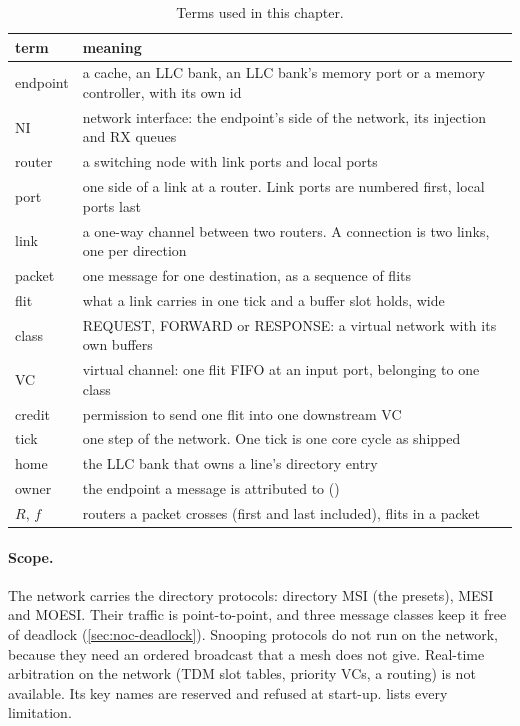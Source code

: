 \begin{table}[htbp]\centering\small
\caption{Terms used in this chapter.}\label{tab:noc-terms}
\begin{tabularx}{\textwidth}{@{}lY@{}}
\toprule term & meaning \\ \midrule
endpoint & a cache, an LLC bank, an LLC bank's memory port or a memory controller, with its own id \\
NI & network interface: the endpoint's side of the network, its injection and RX queues \\
router & a switching node with link ports and local ports \\
port & one side of a link at a router. Link ports are numbered first, local ports last \\
link & a one-way channel between two routers. A connection is two links, one per direction \\
packet & one message for one destination, as a sequence of flits \\
flit & what a link carries in one tick and a buffer slot holds,  wide \\
class & REQUEST, FORWARD or RESPONSE: a virtual network with its own buffers \\
VC & virtual channel: one flit FIFO at an input port, belonging to one class \\
credit & permission to send one flit into one downstream VC \\
tick & one step of the network. One tick is one core cycle as shipped \\
home & the LLC bank that owns a line's directory entry \\
owner & the endpoint a message is attributed to () \\
$R$, $f$ & routers a packet crosses (first and last included), flits in a packet \\
\bottomrule
\end{tabularx}
\end{table}

\paragraph{Scope.} The network carries the directory protocols: directory MSI (the presets),
MESI and MOESI. Their traffic is point-to-point, and three message classes keep it free of
deadlock (\cref{sec:noc-deadlock}). Snooping protocols do not run on the network, because they need
an ordered broadcast that a mesh does not give. Real-time arbitration on the network (TDM slot
tables, priority VCs, a  routing) is not available. Its key names are reserved and
refused at start-up.  lists every limitation.

